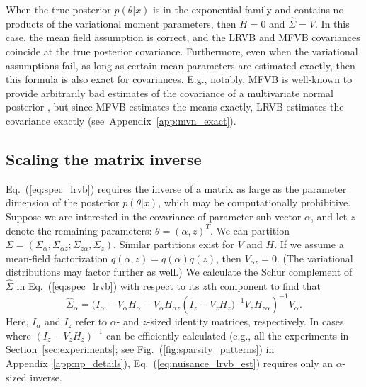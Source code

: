 \documentclass{article}\usepackage[]{graphicx}\usepackage[]{color}
\newcommand{\app}[1]{Appendix~\ref{app:#1}}
\newcommand{\mysec}[1]{Section~\ref{sec:#1}}
\newcommand{\eq}[1]{Eq.~(\ref{eq:#1})}
\newcommand{\fig}[1]{Fig.~(\ref{fig:#1})}
\newcommand{\truecov}{\Sigma} %
\newcommand{\lrcov}{\hat{\Sigma}} %
\newcommand{\vbcov}{V} %
\theoremstyle{plain}
\begin{document}
When the true posterior $p(\theta | x)$ is in the exponential family and
contains no products of the variational moment parameters, then $H=0$ and
$\lrcov=\vbcov$. In this case, the mean field assumption is correct, and the
LRVB and MFVB covariances coincide at the true posterior covariance.
Furthermore, even when the variational assumptions fail, as long as certain mean
parameters are estimated exactly, then this formula is also exact for
covariances. E.g., notably, MFVB is well-known to provide arbitrarily bad
estimates of the covariance of a multivariate normal posterior
\citep{mackay:2003:information,wang:2005:inadequacy,bishop:2006:pattern,turner:2011:two},
but since MFVB estimates the means exactly, LRVB estimates the covariance exactly
(see~\app{mvn_exact}).

\subsection{Scaling the matrix inverse} \label{sec:scaling_formulas}

\eq{spec_lrvb} requires the inverse of a matrix as large
as the parameter dimension of the posterior $p(\theta | x)$,
which may be computationally prohibitive.
Suppose we are interested in the covariance of parameter sub-vector $\alpha$,
and let $z$ denote the remaining parameters: $\theta = \left( \alpha, z \right)^{T}$.
We can partition
%
$
\truecov = \left( \truecov_{\alpha}, \truecov_{\alpha z}; \truecov_{z\alpha}, \truecov_{z} \right).
$
%
Similar partitions exist for $\vbcov$ and $H$.
If we assume a mean-field factorization $q(\alpha,z) = q(\alpha)q(z)$, then
$\vbcov_{\alpha z} = 0$. (The variational
distributions may factor further as well.)
We calculate the Schur complement of $\lrcov$ in \eq{spec_lrvb}
with respect to its $z$th
component to find that %
%
\begin{equation} \label{eq:nuisance_lrvb_est}
\hat{\truecov}_{\alpha} =
 ( I_{\alpha} - V_{\alpha}H_{\alpha} -
  V_{\alpha}H_{\alpha z} \left(I_{z} - V_{z}H_{z})^{-1}
  V_{z}H_{z\alpha}\right)^{-1} V_{\alpha}.
\end{equation}
Here, $I_\alpha$ and $I_z$ refer to $\alpha$- and $z$-sized identity
matrices, respectively.  In cases where
$\left(I_{z} - V_{z}H_{z}\right)^{-1}$
can be efficiently calculated (e.g., all the experiments
in \mysec{experiments}; see \fig{sparsity_patterns} in \app{np_details}),
\eq{nuisance_lrvb_est}
requires only an $\alpha$-sized inverse.
\end{document}
